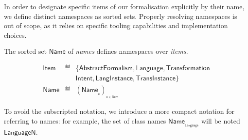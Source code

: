 
\begin{olddef}
In order to designate specific items of our formalisation explicitly by their 
name, we define distinct namespaces as sorted sets. Properly resolving 
namespaces is out of scope, as it relies on specific tooling 
capabilities and implementation choices.

\begin{Definition}[Names]
   The sorted set $\mathsf{Name}$ of \emph{names} defines namespaces over 
\emph{items}.
   \begin{small}
   \begin{displaymath}
     \begin{array}{rcl}
		\mathsf{Item} & \eqdef & \{\mathsf{AbstractFormalism}, \mathsf{Language}, 
\mathsf{Transformation}\\
                    &        & \mathsf{Intent}, \mathsf{LangInstance}, 
\mathsf{TransInstance}\}\\
		\mathsf{Name}    & \eqdef & (\mathsf{Name}_{_{\mathsf{e}}})_{_{\mathsf{e} 
\in \mathsf{Item}}}
      \end{array}
\end{displaymath}
   \end{small}
\end{Definition}
To avoid the subscripted notation, we introduce a more compact notation for 
referring to names: for example, the set of class names 
$\mathsf{Name_{_{Language}}}$ will be noted $\mathsf{LanguageN}$.  
\end{olddef}
